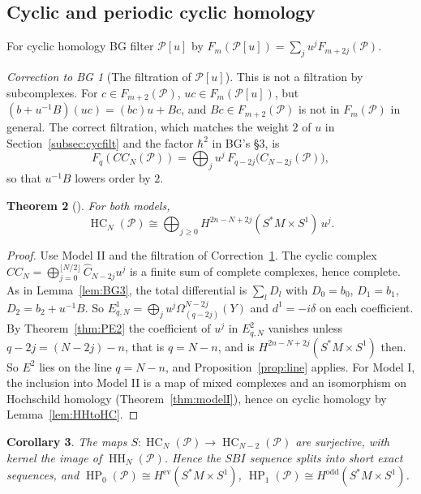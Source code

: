 \documentclass[11pt,oneside,reqno]{article}
\DeclareMathOperator{\HH}{HH}
\DeclareMathOperator{\HC}{HC}
\DeclareMathOperator{\HP}{HP}
\newcommand{\cP}{\mathcal P}
\newcommand{\Om}{\Omega}
\newcommand{\hb}{\hbar}
\newcommand{\Chat}{\widehat C}
\theoremstyle{plain}
\newtheorem{theorem}{Theorem}[section]
\newtheorem{corollary}[theorem]{Corollary}
\theoremstyle{definition}
\theoremstyle{remark}
\newtheorem{correction}[theorem]{Correction to BG}
\begin{document}
\subsection{Cyclic and periodic cyclic homology}\label{subsec:HCP}
For cyclic homology BG filter \(\cP[u]\) by \(F_m(\cP[u])=\sum_ju^jF_{m+2j}(\cP)\).

\begin{correction}[The filtration of \(\cP{[u]}\)]\label{corr:cyclicfilt}
This is not a filtration by subcomplexes. For \(c\in F_{m+2}(\cP)\),
\(uc\in F_m(\cP[u])\), but \((b+u^{-1}B)(uc)=(bc)u+Bc\), and \(Bc\in F_{m+2}(\cP)\) is not in
\(F_m(\cP)\) in general. The correct filtration, which matches the weight \(2\) of
\(u\) in Section~\ref{subsec:cycfilt} and the factor \(\hb^2\) in BG's \S3, is
\[
 F_q(CC_N(\cP))=\bigoplus_ju^j\,F_{q-2j}\bigl(C_{N-2j}(\cP)\bigr),
\]
so that \(u^{-1}B\) lowers order by \(2\).
\end{correction}

\begin{theorem}[{\cite[\S4, Theorem (2)]{BG}}]\label{thm:HCP}
For both models,
\[
 \HC_N(\cP)\cong\bigoplus_{j\ge0}H^{2n-N+2j}(S^*M\times S^1)\,u^j .
\]
\end{theorem}

\begin{proof}
Use Model II and the filtration of Correction~\ref{corr:cyclicfilt}. The
cyclic complex \(CC_N=\bigoplus_{j=0}^{\lfloor N/2\rfloor}\Chat_{N-2j}u^j\) is a finite
sum of complete complexes, hence complete. As in Lemma~\ref{lem:BG3}, the
total differential is \(\sum_lD_l\) with \(D_0=b_0\), \(D_1=b_1\), \(D_2=b_2+u^{-1}B\). So
\(E^1_{q,N}=\bigoplus_ju^j\Om^{N-2j}_{(q-2j)}(Y)\) and \(d^1=-i\delta\) on each coefficient. By
Theorem~\ref{thm:PE2} the coefficient of \(u^j\) in \(E^2_{q,N}\) vanishes unless
\(q-2j=(N-2j)-n\), that is \(q=N-n\), and is \(H^{2n-N+2j}(S^*M\times S^1)\) then. So
\(E^2\) lies on the line \(q=N-n\), and Proposition~\ref{prop:line} applies. For
Model I, the inclusion into Model II is a map of mixed complexes and an
isomorphism on Hochschild homology (Theorem~\ref{thm:modelI}), hence on
cyclic homology by Lemma~\ref{lem:HHtoHC}.
\end{proof}

\begin{corollary}\label{cor:HPP}
The maps \(S:\HC_N(\cP)\to\HC_{N-2}(\cP)\) are surjective, with kernel the image of
\(\HH_N(\cP)\). Hence the \(SBI\) sequence splits into short exact sequences, and
\(\HP_0(\cP)\cong H^{\mathrm{ev}}(S^*M\times S^1)\), \(\HP_1(\cP)\cong H^{\mathrm{odd}}(S^*M\times S^1)\).
\end{corollary}
\end{document}
